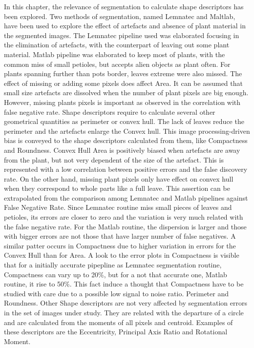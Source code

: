 \documentclass{frontiersSCNS} %
\begin{document}
In this chapter, the relevance of segmentation to calculate shape descriptors has been explored. Two methods of segmentation, named Lemnatec and Maltlab, have been used to explore the effect of artefacts and absence of plant material in the segmented images. The Lemnatec pipeline used was elaborated focusing in the elimination of artefacts, with the counterpart of leaving out some plant material. Matlab pipeline was elaborated to keep most of plants, with the common miss of small petioles, but accepts alien objects as plant often. For plants spanning further than pots border, leaves extreme were also missed.
The effect of missing or adding some pixels does affect Area. It can be assumed that small size artefacts are dissolved when the number of plant pixels are big enough. However, missing plants pixels is important as observed in the correlation with false negative rate.
Shape descriptors require to calculate several other geometrical quantities as perimeter or convex hull. The lack of leaves reduce the perimeter and the artefacts enlarge the Convex hull. This image processing-driven bias is conveyed to the shape descriptors calculated from them, like Compactness and Roundness.
Convex Hull Area is positively biased when artefacts are away from the plant, but not very dependent of the size of the artefact. This is represented with a low correlation between positive errors and the false discovery rate. On the other hand, missing plant pixels only have effect on convex hull when they correspond to whole parts like a full leave. This assertion can be extrapolated from the comparison among Lemnatec and Matlab pipelines against False Negative Rate. Since Lemnatec routine miss small pieces of leaves and petioles, its errors are closer to zero and the variation is very much related with the false negative rate. For the Matlab routine, the dispersion is larger and those with bigger errors are not those that have larger number of false negatives. A similar patter occurs in Compactness due to higher variation in errors for the Convex Hull than for Area. A look to the error plots in Compactness is visible that for a initially accurate pipepline as Lemnatec segmentation routine, Compactness can vary up to 20\%, but for a not that accurate one, Matlab routine, it rise to 50\%. This fact induce a thought that Compactness have to be studied with care due to a possible low signal to noise ratio.
Perimeter and Roundness.
Other Shape descriptors are not very affected by segmentation errors in the set of images under study. They are related with the departure of a circle and are calculated from the moments of all pixels and centroid. Examples of these descriptors are the Eccentricity, Principal Axis Ratio and Rotational Moment.
\end{document}
